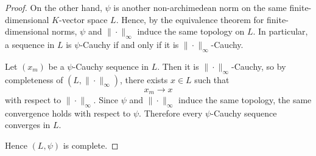 \begin{proof}
    On the other hand, \(\psi\) is another non-archimedean norm on the same
    finite-dimensional \(K\)-vector space \(L\). Hence, by the equivalence theorem
    for finite-dimensional norms, \(\psi\) and \(\|\cdot\|_{\infty}\) induce the
    same topology on \(L\). In particular, a sequence in \(L\) is \(\psi\)-Cauchy
    if and only if it is \(\|\cdot\|_{\infty}\)-Cauchy.

    Let \((x_m)\) be a \(\psi\)-Cauchy sequence in \(L\). Then it is
    \(\|\cdot\|_{\infty}\)-Cauchy, so by completeness of
    \((L,\|\cdot\|_{\infty})\), there exists \(x\in L\) such that
    \[
        x_m\longrightarrow x
    \]
    with respect to \(\|\cdot\|_{\infty}\). Since \(\psi\) and
    \(\|\cdot\|_{\infty}\) induce the same topology, the same convergence holds
    with respect to \(\psi\). Therefore every \(\psi\)-Cauchy sequence converges in
    \(L\).

    Hence \((L,\psi)\) is complete.
\end{proof}

